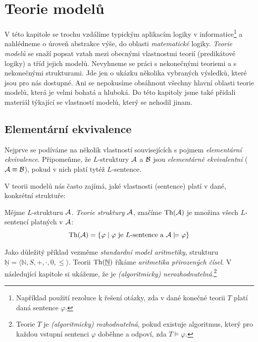 \chapter{Teorie modelů}\label{chapter:model-theory}

V této kapitole se trochu vzdálíme typickým aplikacím logiky v informatice\footnote{Například použití rezoluce k řešení otázky, zda v dané konečné teorii $T$ platí daná sentence $\varphi$.} a nahlédneme o úroveň abstrakce výše, do oblasti \emph{matematické} logiky. \emph{Teorie modelů} se snaží popsat vztah mezi obecnými vlastnostmi teorií (predikátové logiky) a tříd jejich modelů. Nevyhneme se práci s nekonečnými teoriemi a s nekonečnými strukturami. Jde jen o ukázku několika vybraných výsledků, které jsou pro nás dostupné. Ani se nepokusíme obsáhnout všechny hlavní oblasti teorie modelů, která je velmi bohatá a hluboká. Do této kapitoly jsme také přidali materiál týkající se vlastností modelů, který se nehodil jinam.


\section{Elementární ekvivalence}

Nejprve se podíváme na několik vlastností souvisejících s pojmem \emph{elementární ekvivalence}. Připomeňme, že $L$-struktury $\mathcal{A}$ a $\mathcal{B}$ jsou \emph{elementárně ekvivalentní} ($\mathcal{A}\equiv \mathcal{B}$), pokud v nich platí tytéž $L$-sentence.

V teorii modelů nás často zajímá, jaké vlastnosti (sentence) platí v dané, konkrétní struktuře:

\begin{definition}
Mějme $L$-strukturu $\mathcal{A}$. \emph{Teorie struktury} $\mathcal{A}$, značíme $\operatorname{Th}(\mathcal{A})$ je množina všech $L$-sentencí platných v $\mathcal{A}$:
$$
\operatorname{Th}(\mathcal{A})=\{\varphi\mid\varphi\text{ je $L$-sentence a }\mathcal{A}\models\varphi\}
$$
\end{definition}

\begin{example}
Jako důležitý příklad vezměme \emph{standardní model aritmetiky}, strukturu $\underline{\mathbb{N}}=\langle\mathbb{N},S,+,\cdot,0,\le\rangle$. Teorii $\operatorname{Th}(\underline{\mathbb{N}})$ říkáme \emph{aritmetika přirozených čísel}. V následující kapitole si ukážeme, že je \emph{(algoritmicky) nerozhodnutelná}.\footnote{Teorie $T$ je \emph{(algoritmicky) rozhodnutelná}, pokud existuje algoritmus, který pro každou vstupní sentenci $\varphi$ doběhne a odpoví, zda $T\models\varphi$.}
\end{example}

